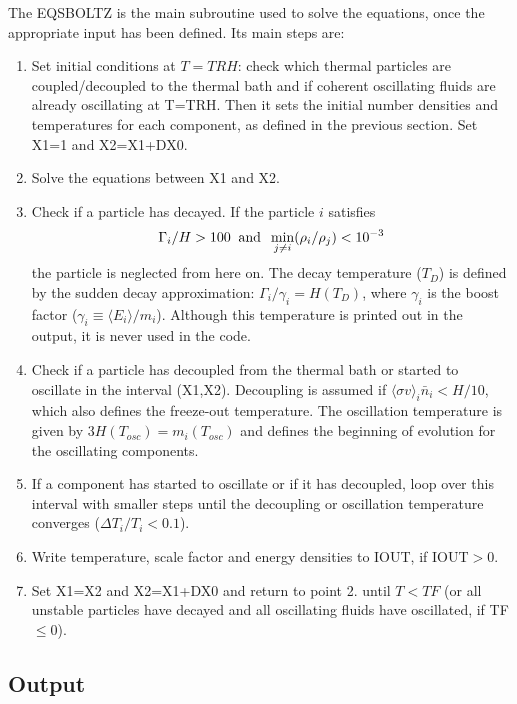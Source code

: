 \documentclass[preprint,notoc]{JHEP3}
\def\be{\begin{equation}}
\def\ee{\end{equation}}
\def\sigv{\langle \sigma v \rangle}
\begin{document}
The EQSBOLTZ is the main subroutine used to solve the equations, once the appropriate input has been defined. Its main steps
are:
\begin{enumerate}
\item Set initial conditions at $T=TRH$: check which thermal particles are coupled/decoupled to the thermal bath and if coherent
oscillating fluids are already oscillating at T=TRH. Then it sets the initial
number densities and temperatures for each component, as defined in the previous section. Set X1=1 and X2=X1+DX0.
\item Solve the equations between X1 and X2.
\item Check if a particle has decayed. If the particle $i$ satisfies
\be
\Gamma_i/H > 100\;\; {\rm and}\;\; \min_{j \neq i}(\rho_i/\rho_j)< 10^{-3}
\ee
the particle is neglected from here on. 
The decay temperature ($T_D$) is defined by the sudden decay approximation: $\Gamma_i/\gamma_i = H(T_D)$, where $\gamma_i$ is
the boost factor ($\gamma_i \equiv \langle E_i \rangle/m_i$). Although this temperature
is printed out in the output, it is never used in the code.
\item Check if a particle has decoupled from the thermal bath or started to oscillate in the interval (X1,X2).
Decoupling is assumed if $\sigv_i \bar{n}_i < H/10$, which also defines the freeze-out temperature.
The oscillation temperature is given by $3 H(T_{osc}) = m_i(T_{osc})$ and defines the beginning of evolution for
the oscillating components.
\item If a component has started to oscillate or if it has decoupled, loop over this interval with smaller steps until the decoupling or oscillation temperature converges ($\Delta T_i/T_i < 0.1$).
\item Write temperature, scale factor and energy densities to IOUT, if IOUT$>0$.
\item Set X1=X2 and X2=X1+DX0 and return to point 2. until $T<TF$ (or all unstable particles have decayed and all oscillating
fluids have oscillated, if TF$\leq 0$).
\end{enumerate}




\subsection{Output}
\label{sec:Out}
\end{document}
